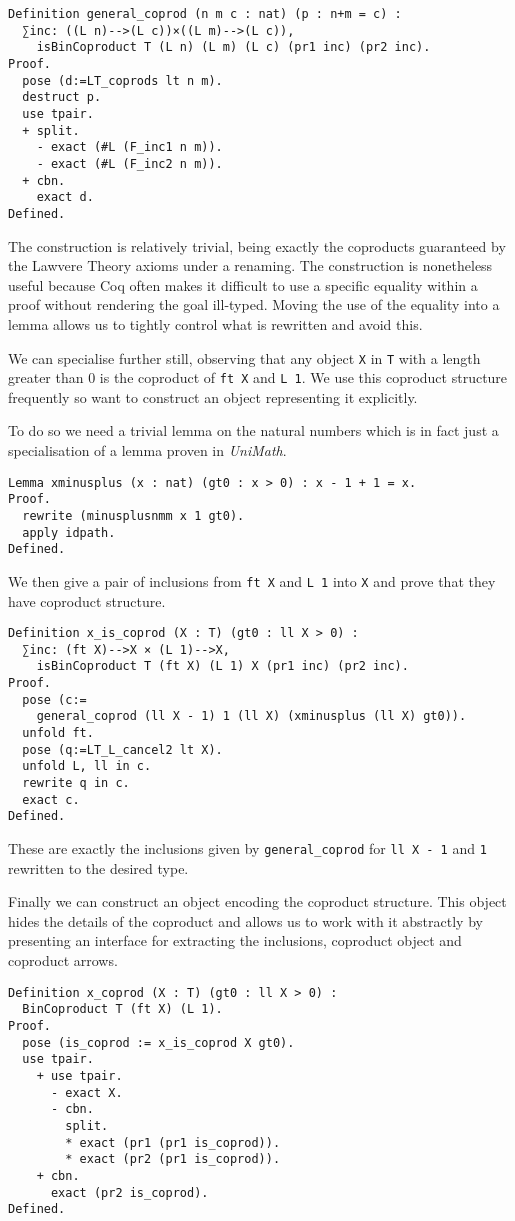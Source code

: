\begin{lstlisting}
Definition general_coprod (n m c : nat) (p : n+m = c) : 
  ∑inc: ((L n)-->(L c))×((L m)-->(L c)),
    isBinCoproduct T (L n) (L m) (L c) (pr1 inc) (pr2 inc).
Proof.
  pose (d:=LT_coprods lt n m).
  destruct p.
  use tpair.
  + split.
    - exact (#L (F_inc1 n m)).
    - exact (#L (F_inc2 n m)).
  + cbn.
    exact d.
Defined.
\end{lstlisting}

The construction is relatively trivial, being exactly the coproducts guaranteed
by the Lawvere Theory axioms under a renaming. The construction is nonetheless
useful because Coq often makes it difficult to use a specific equality within a
proof without rendering the goal ill-typed. Moving the use of the equality into
a lemma allows us to tightly control what is rewritten and avoid this.

We can specialise further still, observing that any object \lstinline|X| in
\lstinline|T| with a length greater than 0 is the coproduct of \lstinline|ft X|
and \lstinline|L 1|. We use this coproduct structure frequently so want to
construct an object representing it explicitly.

To do so we need a trivial lemma on the natural numbers which is in fact just a
specialisation of a lemma proven in \textit{UniMath}.

\begin{lstlisting}
Lemma xminusplus (x : nat) (gt0 : x > 0) : x - 1 + 1 = x.
Proof.
  rewrite (minusplusnmm x 1 gt0).
  apply idpath.
Defined.
\end{lstlisting}

We then give a pair of inclusions from \lstinline|ft X| and \lstinline|L 1| into \lstinline|X|
and prove that they have coproduct structure. 
\begin{lstlisting}
Definition x_is_coprod (X : T) (gt0 : ll X > 0) : 
  ∑inc: (ft X)-->X × (L 1)-->X, 
    isBinCoproduct T (ft X) (L 1) X (pr1 inc) (pr2 inc).
Proof.
  pose (c:=
    general_coprod (ll X - 1) 1 (ll X) (xminusplus (ll X) gt0)).
  unfold ft.
  pose (q:=LT_L_cancel2 lt X).
  unfold L, ll in c.
  rewrite q in c.
  exact c.
Defined.
\end{lstlisting}

These are exactly the inclusions given by \lstinline|general_coprod| for 
\lstinline|ll X - 1| and \lstinline|1| rewritten to the desired type.

Finally we can construct an object encoding the coproduct structure. This object
hides the details of the coproduct and allows us to work with it abstractly by
presenting an interface for extracting the inclusions, coproduct object and
coproduct arrows.
\begin{lstlisting}
Definition x_coprod (X : T) (gt0 : ll X > 0) : 
  BinCoproduct T (ft X) (L 1).
Proof.
  pose (is_coprod := x_is_coprod X gt0).
  use tpair.
    + use tpair.
      - exact X.
      - cbn.
        split.
        * exact (pr1 (pr1 is_coprod)).
        * exact (pr2 (pr1 is_coprod)).
    + cbn.
      exact (pr2 is_coprod).
Defined.
\end{lstlisting}

